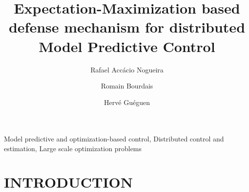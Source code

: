 \documentclass{ifacconf}  %
\begin{document}
\begin{frontmatter}
\title{\LARGE \bf
  Expectation-Maximization based defense mechanism for distributed Model Predictive Control
}

\author[First]{Rafael Accácio Nogueira}
\author[First]{Romain Bourdais}
\author[First]{Hervé Guéguen}
\address[First]{IETR-CentraleSupélec, 35510 Cesson-Sévigné, Ille-et-Vilaine, France\\
{\tt\small \{rafael-accacio.nogueira, romain.bourdais, herve.gueguen\}
@centralesupelec.fr}}




\begin{abstract}%
\end{abstract}

\begin{keyword}
  Model predictive and optimization-based control,
  Distributed control and estimation,
Large scale optimization problems
\end{keyword}

\end{frontmatter}

\section{INTRODUCTION}


\end{document}
